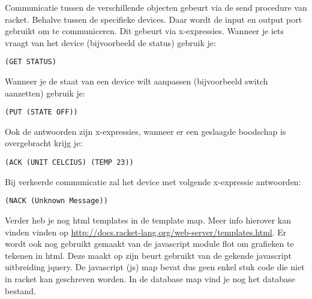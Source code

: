 \documentclass{article}
\begin{document}
Communicatie tussen de verschillende objecten gebeurt via de send procedure van racket. Behalve tussen de specifieke devices. Daar wordt de input en output port gebruikt om te communiceren. Dit gebeurt via x-expressies. Wanneer je iets vraagt van het device (bijvoorbeeld de status) gebruik je:
\begin{lstlisting}
(GET STATUS)
\end{lstlisting}
Wanneer je de staat van een device wilt aanpassen (bijvoorbeeld switch aanzetten) gebruik je:
\begin{lstlisting}
(PUT (STATE OFF))
\end{lstlisting}
Ook de antwoorden zijn x-expressies, wanneer er een geslaagde boodschap is overgebracht krijg je:
\begin{lstlisting}
(ACK (UNIT CELCIUS) (TEMP 23))
\end{lstlisting}
Bij verkeerde communicatie zal het device met volgende x-expressie antwoorden:
\begin{lstlisting}
(NACK (Unknown Message))
\end{lstlisting}
Verder heb je nog html templates in de template map. Meer info hierover kan vinden vinden op \href{http://docs.racket-lang.org/web-server/templates.html}{http://docs.racket-lang.org/web-server/templates.html}. Er wordt ook nog gebruikt gemaakt van de javascript module flot om grafieken te tekenen in html. Deze maakt op zijn beurt gebruikt van de gekende javascript uitbreiding jquery. De javascript (js) map bevat dus geen enkel stuk code die niet in racket kan geschreven worden.
In de database map vind je nog het database bestand.\\




 
\end{document}
